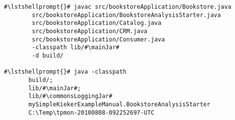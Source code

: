 \begin{lstlisting}[caption=Compile and run under Windows,label=lst:bookstoreAnalysisStarterWin] 			
#\lstshellprompt{}# javac src/bookstoreApplication/Bookstore.java 
        src/bookstoreApplication/BookstoreAnalysisStarter.java 
        src/bookstoreApplication/Catalog.java 
        src/bookstoreApplication/CRM.java 
        src/bookstoreApplication/Consumer.java
        -classpath lib/#\mainJar#
        -d build/

#\lstshellprompt{}# java -classpath 
       build/;
       lib/#\mainJar#;
       lib/#\commonsLoggingJar#
       mySimpleKiekerExampleManual.BookstoreAnalysisStarter 
       C:\Temp\tpmon-20100808-092252697-UTC
\end{lstlisting}	
